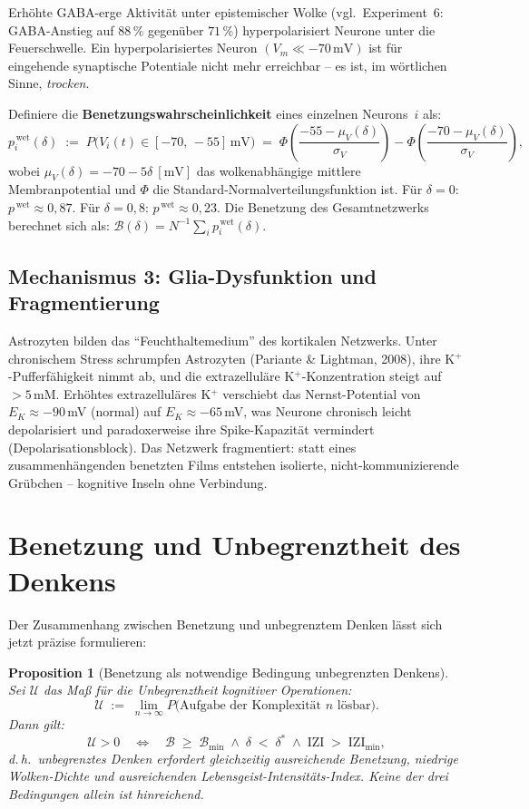 ﻿\documentclass[12pt,a4paper]{report}
\theoremstyle{plain}
\newtheorem{proposition}[theorem]{Proposition}
\theoremstyle{definition}
\theoremstyle{remark}
\begin{document}
	Erhöhte GABA-erge Aktivität unter epistemischer Wolke
	(vgl.\ Experiment~6: GABA-Anstieg auf $88\,\%$ gegenüber $71\,\%$)
	hyperpolarisiert Neurone unter die Feuerschwelle.
	Ein hyperpolarisiertes Neuron $(V_m \ll -70\,\text{mV})$ ist
	für eingehende synaptische Potentiale nicht mehr erreichbar --
	es ist, im wörtlichen Sinne, \emph{trocken}.

	Definiere die \textbf{Benetzungswahrscheinlichkeit} eines einzelnen
	Neurons~$i$ als:
	\[
	p_i^{\,\text{wet}}(\delta)
	\;:=\; P\bigl(V_i(t) \in [-70,\,-55]\,\text{mV}\bigr)
	\;=\; \Phi\!\left(\frac{-55 - \mu_V(\delta)}{\sigma_V}\right)
	-
	\Phi\!\left(\frac{-70 - \mu_V(\delta)}{\sigma_V}\right),
	\]
	wobei $\mu_V(\delta) = -70 - 5\delta \ [\text{mV}]$
	das wolkenabhängige mittlere Membranpotential und
	$\Phi$ die Standard-Normalverteilungsfunktion ist.
	Für $\delta = 0$: $p^{\,\text{wet}} \approx 0{,}87$.
	Für $\delta = 0{,}8$: $p^{\,\text{wet}} \approx 0{,}23$.
	Die Benetzung des Gesamtnetzwerks berechnet sich als:
	$\mathcal{B}(\delta) = N^{-1}\sum_i p_i^{\,\text{wet}}(\delta)$.

	\subsection{Mechanismus 3: Glia-Dysfunktion und Fragmentierung}

	Astrozyten bilden das ``Feuchthaltemedium'' des kortikalen Netzwerks.
	Unter chronischem Stress schrumpfen Astrozyten
	(Pariante \& Lightman, 2008), ihre K$^+$-Pufferfähigkeit nimmt ab,
	und die extrazelluläre K$^+$-Konzentration steigt auf $> 5\,\text{mM}$.
	Erhöhtes extrazelluläres K$^+$ verschiebt das Nernst-Potential von
	$E_K \approx -90$\,mV (normal) auf $E_K \approx -65$\,mV,
	was Neurone chronisch leicht depolarisiert und paradoxerweise
	ihre Spike-Kapazität vermindert (Depolarisationsblock).
	Das Netzwerk fragmentiert: statt eines zusammenhängenden benetzten
	Films entstehen isolierte, nicht-kommunizierende Grübchen --
	kognitive Inseln ohne Verbindung.

	\section{Benetzung und Unbegrenztheit des Denkens}

	Der Zusammenhang zwischen Benetzung und unbegrenztem Denken lässt
	sich jetzt präzise formulieren:

	\begin{proposition}[Benetzung als notwendige Bedingung unbegrenzten Denkens]
		\label{prop:unbegrenzt}
		Sei $\mathcal{U}$ das Maß für die Unbegrenztheit kognitiver Operationen:
		\[
		\mathcal{U} \;:=\;
		\lim_{n \to \infty} P\bigl(\text{Aufgabe der Komplexität } n
		\text{ lösbar}\bigr).
		\]
		Dann gilt:
		\[
		\mathcal{U} > 0
		\quad\Longleftrightarrow\quad
		\mathcal{B} \;\geq\; \mathcal{B}_{\min}
		\;\wedge\;
		\delta \;<\; \delta^*
		\;\wedge\;
		\mathrm{IZI} \;>\; \mathrm{IZI}_{\min},
		\]
		d.\,h.\ unbegrenztes Denken erfordert \emph{gleichzeitig}
		ausreichende Benetzung, niedrige Wolken-Dichte
		\emph{und} ausreichenden Lebensgeist-Intensitäts-Index.
		Keine der drei Bedingungen allein ist hinreichend.
	\end{proposition}
\end{document}
